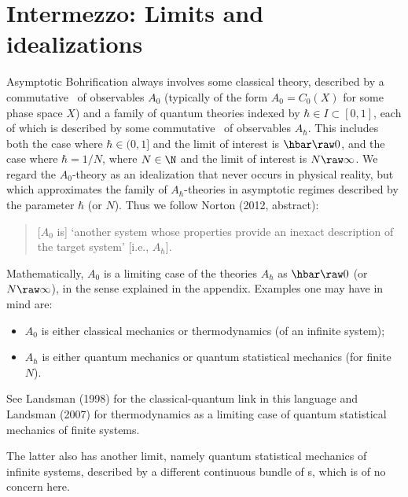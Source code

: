 \documentclass[12pt]{article}
\begin{document}
\section{Intermezzo: Limits and idealizations}\label{ideal}
Asymptotic  Bohrification always involves some classical theory, described by a commutative \ca\ of observables $A_0$ (typically of the form $A_0=C_0(X)$ for some phase space $X$) and a family of quantum theories indexed by $\hbar\in I\subset [0,1]$, each of which is described by some commutative \ca\ of observables $A_{\hbar}$. This  includes both the case where 
$\hbar\in(0,1]$ and the limit of interest is $\hbar\raw 0$, and the case where
$\hbar=1/N$, where $N\in\N$  and the limit of interest is $N\raw\infty$. We regard the $A_0$-theory as an idealization that never occurs in physical reality, but which  approximates the family of $A_{\hbar}$-theories in asymptotic regimes described by the parameter $\hbar$ (or $N$). Thus we follow Norton (2012, abstract):
\begin{quotation} [$A_0$ is]
`another system whose properties provide an inexact description of the target system' [i.e., $A_{\hbar}$].
\end{quotation}
Mathematically, $A_0$  is a limiting case of the theories  $A_{\hbar}$
as $\hbar\raw 0$ (or $N\raw\infty$), in the sense explained in the appendix. 
Examples one may have in mind are:
\begin{itemize}
\item  $A_0$ is either classical mechanics or thermodynamics (of an infinite system);
\item $A_{\hbar}$ is either quantum mechanics or quantum statistical mechanics (for finite $N$).
\end{itemize}
See Landsman (1998) for the classical-quantum link in this language and  Landsman (2007) for thermodynamics as a limiting case of quantum statistical mechanics of finite systems.

\noindent 
The latter also has another limit, namely quantum statistical mechanics of infinite systems, described by a different continuous bundle of \ca s, which is of no concern here.
\end{document}
